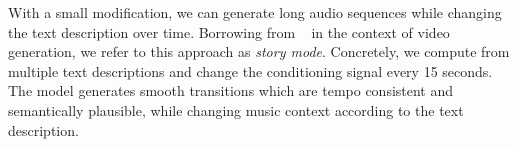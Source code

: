 With a small modification, we can generate long audio sequences while changing the text description over time. Borrowing from ~\citet{phenaki} in the context of video generation, we refer to this approach as \emph{story mode}. Concretely, we compute  from multiple text descriptions and change the conditioning signal every 15 seconds. The model generates smooth transitions which are tempo consistent and semantically plausible, while changing music context according to the text description.
